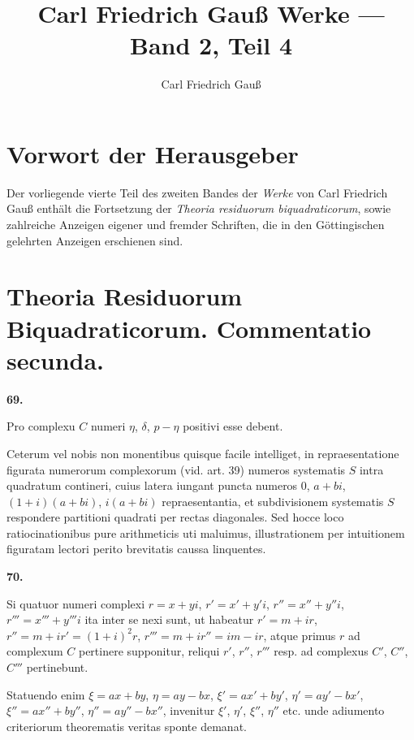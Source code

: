 \documentclass[12pt,a4paper]{article}
\title{Carl Friedrich Gauß Werke --- Band 2, Teil 4}
\author{Carl Friedrich Gauß}
\date{}
\theoremstyle{plain}
\theoremstyle{definition}
\theoremstyle{remark}
\begin{document}
\maketitle
\thispagestyle{empty}

\section*{Vorwort der Herausgeber}

Der vorliegende vierte Teil des zweiten Bandes der \textit{Werke} von Carl Friedrich Gauß enthält die Fortsetzung der \textit{Theoria residuorum biquadraticorum}, sowie zahlreiche Anzeigen eigener und fremder Schriften, die in den Göttingischen gelehrten Anzeigen erschienen sind.

\bigskip

\section*{Theoria Residuorum Biquadraticorum. Commentatio secunda.}


\noindent\textbf{69.}

Pro complexu $C$ numeri $\eta$, $\delta$, $p - \eta$ positivi esse debent.

Ceterum vel nobis non monentibus quisque facile intelliget, in repraesentatione figurata numerorum complexorum (vid. art. 39) numeros systematis $S$ intra quadratum contineri, cuius latera iungant puncta numeros $0$, $a+bi$, $(1+i)(a+bi)$, $i(a+bi)$ repraesentantia, et subdivisionem systematis $S$ respondere partitioni quadrati per rectas diagonales. Sed hocce loco ratiocinationibus pure arithmeticis uti maluimus, illustrationem per intuitionem figuratam lectori perito brevitatis caussa linquentes.

\bigskip

\noindent\textbf{70.}

Si quatuor numeri complexi $r = x+yi$, $r' = x'+y'i$, $r'' = x''+y''i$, $r''' = x'''+y'''i$ ita inter se nexi sunt, ut habeatur $r' = m+ir$, $r'' = m+ir' = (1+i)^2 r$, $r''' = m+ir'' = im-ir$, atque primus $r$ ad complexum $C$ pertinere supponitur, reliqui $r'$, $r''$, $r'''$ resp. ad complexus $C'$, $C''$, $C'''$ pertinebunt.

Statuendo enim $\xi = ax+by$, $\eta = ay-bx$, $\xi' = ax'+by'$, $\eta' = ay'-bx'$, $\xi'' = ax''+by''$, $\eta'' = ay''-bx''$, invenitur $\xi'$, $\eta'$, $\xi''$, $\eta''$ etc. unde adiumento criteriorum theorematis veritas sponte demanat.
\end{document}
